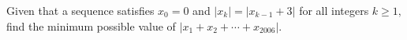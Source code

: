 Given that a sequence satisfies $x_0=0$ and $|x_k|=|x_{k-1}+3|$ for all integers $k\ge 1,$ find the minimum possible value of $|x_1+x_2+\cdots+x_{2006}|$.